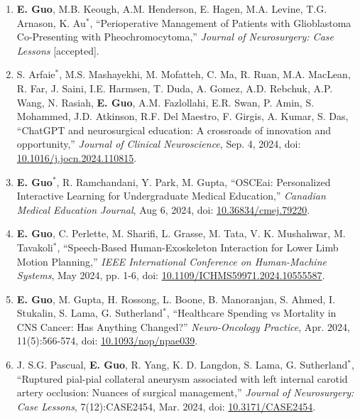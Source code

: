 \documentclass{article}
\begin{document}
\begin{enumerate}
    \item \textbf{E. Guo}, M.B. Keough, A.M. Henderson, E. Hagen, M.A. Levine, T.G. Arnason, K. Au$^*$, ``Perioperative Management of Patients with Glioblastoma Co-Presenting with Pheochromocytoma,'' \textit{Journal of Neurosurgery: Case Lessons} [accepted].
    \item S. Arfaie$^*$, M.S. Mashayekhi, M. Mofatteh, C. Ma, R. Ruan, M.A. MacLean, R. Far, J. Saini, I.E. Harmsen, T. Duda, A. Gomez, A.D. Rebchuk, A.P. Wang, N. Rasiah, \textbf{E. Guo}, A.M. Fazlollahi, E.R. Swan, P. Amin, S. Mohammed, J.D. Atkinson, R.F. Del Maestro, F. Girgis, A. Kumar, S. Das, ``ChatGPT and neurosurgical education: A crossroads of innovation and opportunity,'' \textit{Journal of Clinical Neuroscience}, Sep. 4, 2024, doi: \href{https://doi.org/10.1109/ICHMS59971.2024.10555587}{10.1016/j.jocn.2024.110815}.
    \item \textbf{E. Guo}$^*$, R. Ramchandani, Y. Park, M. Gupta, ``OSCEai: Personalized Interactive Learning for Undergraduate Medical Education,'' \textit{Canadian Medical Education Journal}, Aug 6, 2024, doi: \href{https://doi.org/10.36834/cmej.79220}{10.36834/cmej.79220}.
    \item \textbf{E. Guo}, C. Perlette, M. Sharifi, L. Grasse, M. Tata, V. K. Mushahwar, M. Tavakoli$^*$, ``Speech-Based Human-Exoskeleton Interaction for Lower Limb Motion Planning,''  \textit{IEEE International Conference on Human-Machine Systems}, May 2024, pp. 1-6, doi: \href{https://doi.org/10.1109/ICHMS59971.2024.10555587}{10.1109/ICHMS59971.2024.10555587}.
    \item \textbf{E. Guo}, M. Gupta, H. Rossong, L. Boone, B. Manoranjan, S. Ahmed, I. Stukalin, S. Lama, G. Sutherland$^*$, ``Healthcare Spending vs Mortality in CNS Cancer: Has Anything Changed?'' \textit{Neuro-Oncology Practice}, Apr. 2024, 11(5):566-574, doi: \href{https://doi.org/10.1093/nop/npae039}{10.1093/nop/npae039}.
    \item J. S.G. Pascual, \textbf{E. Guo}, R. Yang, K. D. Langdon, S. Lama, G. Sutherland$^*$, ``Ruptured pial-pial collateral aneurysm associated with left internal carotid artery occlusion: Nuances of surgical management,'' \textit{Journal of Neurosurgery: Case Lessons}, 7(12):CASE2454, Mar. 2024, doi: \href{https://doi.org/10.3171/CASE2454}{10.3171/CASE2454}.

\end{enumerate}
\end{document}
